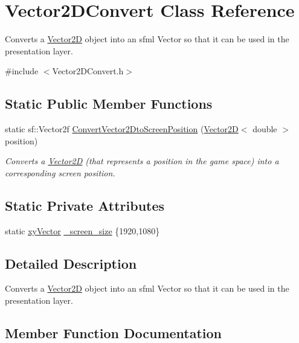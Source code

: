 \hypertarget{class_vector2_d_convert}{}\section{Vector2\+D\+Convert Class Reference}
\label{class_vector2_d_convert}


Converts a \hyperlink{class_vector2_d}{Vector2D} object into an sfml Vector so that it can be used in the presentation layer.  




{\ttfamily \#include $<$Vector2\+D\+Convert.\+h$>$}

\subsection*{Static Public Member Functions}
\begin{DoxyCompactItemize}
\item 
static sf\+::\+Vector2f \hyperlink{class_vector2_d_convert_aa4aff52a3a85d4b7da4123e7b73d2d24}{Convert\+Vector2\+Dto\+Screen\+Position} (\hyperlink{class_vector2_d}{Vector2D}$<$ double $>$ position)
\begin{DoxyCompactList}\small\item\em Converts a \hyperlink{class_vector2_d}{Vector2D} (that represents a position in the game space) into a corresponding screen position. \end{DoxyCompactList}\end{DoxyCompactItemize}
\subsection*{Static Private Attributes}
\begin{DoxyCompactItemize}
\item 
static \hyperlink{structxy_vector}{xy\+Vector} \hyperlink{class_vector2_d_convert_a6eef0a8081bf94301b98332ef362be2c}{\+\_\+screen\+\_\+size} \{1920,1080\}
\end{DoxyCompactItemize}


\subsection{Detailed Description}
Converts a \hyperlink{class_vector2_d}{Vector2D} object into an sfml Vector so that it can be used in the presentation layer. 

\subsection{Member Function Documentation}
\mbox{\label{class_vector2_d_convert_aa4aff52a3a85d4b7da4123e7b73d2d24}} 
